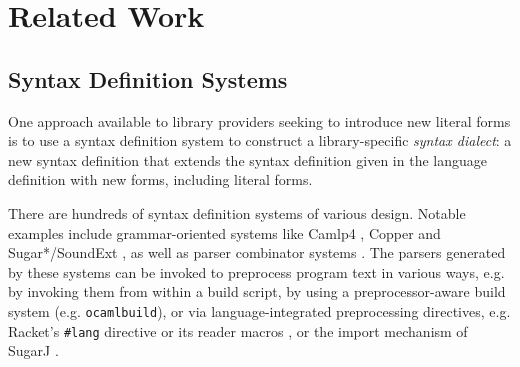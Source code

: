 \documentclass[acmsmall,review,anonymous]{acmart}\settopmatter{printfolios=true,printccs=false,printacmref=false}
\newcommand{\li}[1]{\lstinline[basicstyle=\ttfamily\fontsize{9pt}{1em}\selectfont]{#1}}
\begin{document}
\newcommand{\rwSec}{Related Work}
\section{\protect\rwSec}
\label{sec:existing-approaches}
\subsection{Syntax Definition Systems}\label{sec:syntax-dialects-intro}
One approach available to library providers seeking to introduce new literal forms is to use a syntax definition system to construct a library-specific \emph{syntax dialect}: a new syntax definition that extends the syntax definition given in the language definition with new forms, including literal forms.%



There are hundreds of syntax definition systems of various design. Notable examples include grammar-oriented systems like Camlp4 \cite{ocaml-manual}, Copper \cite{conf/gpce/WykS07,conf/pldi/SchwerdfegerW09} and Sugar*/SoundExt \cite{erdweg2011sugarj,erdweg2013framework,conf/icfp/LorenzenE13,conf/popl/LorenzenE16}, as well as parser combinator systems \cite{Hutton1992d}. The parsers generated by these systems can be invoked to preprocess program text in various ways, e.g. by invoking them from within a build script, by using a preprocessor-aware build system (e.g. \li{ocamlbuild}), or via language-integrated preprocessing directives, e.g. Racket's \li{#lang} directive or its reader macros \cite{Flatt:2012:CLR:2063176.2063195}, or the import mechanism of SugarJ \cite{erdweg2011sugarj}.%
\end{document}
